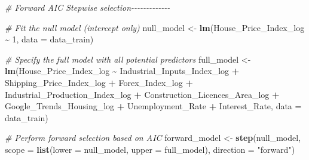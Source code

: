 \documentclass[
]{article}
\newenvironment{Shaded}{\begin{snugshade}}{\end{snugshade}}
\newcommand{\AttributeTok}[1]{\textcolor[rgb]{0.13,0.29,0.53}{#1}}
\newcommand{\CommentTok}[1]{\textcolor[rgb]{0.56,0.35,0.01}{\textit{#1}}}
\newcommand{\DecValTok}[1]{\textcolor[rgb]{0.00,0.00,0.81}{#1}}
\newcommand{\FunctionTok}[1]{\textcolor[rgb]{0.13,0.29,0.53}{\textbf{#1}}}
\newcommand{\NormalTok}[1]{#1}
\newcommand{\OtherTok}[1]{\textcolor[rgb]{0.56,0.35,0.01}{#1}}
\newcommand{\SpecialCharTok}[1]{\textcolor[rgb]{0.81,0.36,0.00}{\textbf{#1}}}
\newcommand{\StringTok}[1]{\textcolor[rgb]{0.31,0.60,0.02}{#1}}
\begin{document}
\begin{Shaded}
\begin{Highlighting}[]
\CommentTok{\# Forward AIC Stepwise selection{-}{-}{-}{-}{-}{-}{-}{-}{-}{-}{-}{-}{-}}

\CommentTok{\# Fit the null model (intercept only)}
\NormalTok{null\_model }\OtherTok{\textless{}{-}} \FunctionTok{lm}\NormalTok{(House\_Price\_Index\_log }\SpecialCharTok{\textasciitilde{}} \DecValTok{1}\NormalTok{, }\AttributeTok{data =}\NormalTok{ data\_train)}

\CommentTok{\# Specify the full model with all potential predictors}
\NormalTok{full\_model }\OtherTok{\textless{}{-}} \FunctionTok{lm}\NormalTok{(House\_Price\_Index\_log }\SpecialCharTok{\textasciitilde{}}\NormalTok{ Industrial\_Inputs\_Index\_log }\SpecialCharTok{+}\NormalTok{ Shipping\_Price\_Index\_log }\SpecialCharTok{+}\NormalTok{ Forex\_Index\_log }\SpecialCharTok{+}\NormalTok{ Industrial\_Production\_Index\_log }\SpecialCharTok{+} 
\NormalTok{                   Construction\_Licences\_Area\_log }\SpecialCharTok{+}\NormalTok{ Google\_Trends\_Housing\_log }\SpecialCharTok{+} 
\NormalTok{                   Unemployment\_Rate }\SpecialCharTok{+}\NormalTok{ Interest\_Rate, }\AttributeTok{data =}\NormalTok{ data\_train)}

\CommentTok{\# Perform forward selection based on AIC}
\NormalTok{forward\_model }\OtherTok{\textless{}{-}} \FunctionTok{step}\NormalTok{(null\_model, }
                      \AttributeTok{scope =} \FunctionTok{list}\NormalTok{(}\AttributeTok{lower =}\NormalTok{ null\_model, }\AttributeTok{upper =}\NormalTok{ full\_model), }
                      \AttributeTok{direction =} \StringTok{"forward"}\NormalTok{)}
\end{Highlighting}
\end{Shaded}
\end{document}
